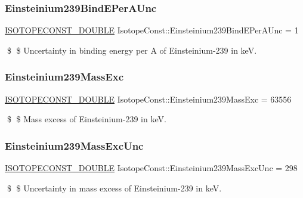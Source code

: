 \subsubsection{\texorpdfstring{Einsteinium239\+Bind\+E\+Per\+A\+Unc}{Einsteinium239BindEPerAUnc}}
{\footnotesize\ttfamily \mbox{\hyperlink{group___isotope_const-_macros_ga8f45a7272ce02c0b4c65c44636ed719a}{I\+S\+O\+T\+O\+P\+E\+C\+O\+N\+S\+T\+\_\+\+D\+O\+U\+B\+LE}} Isotope\+Const\+::\+Einsteinium239\+Bind\+E\+Per\+A\+Unc = 1}

\$ \$ Uncertainty in binding energy per A of Einsteinium-\/239 in keV. \mbox{\label{group___isotope_const-_einsteinium-_es239_gafae2258f4bb67cee3b976cdb4d773bc5}} 
\subsubsection{\texorpdfstring{Einsteinium239\+Mass\+Exc}{Einsteinium239MassExc}}
{\footnotesize\ttfamily \mbox{\hyperlink{group___isotope_const-_macros_ga8f45a7272ce02c0b4c65c44636ed719a}{I\+S\+O\+T\+O\+P\+E\+C\+O\+N\+S\+T\+\_\+\+D\+O\+U\+B\+LE}} Isotope\+Const\+::\+Einsteinium239\+Mass\+Exc = 63556}

\$ \$ Mass excess of Einsteinium-\/239 in keV. \mbox{\label{group___isotope_const-_einsteinium-_es239_ga7c50b6843021e6f20bd4f8ac5c2fa7e6}} 
\subsubsection{\texorpdfstring{Einsteinium239\+Mass\+Exc\+Unc}{Einsteinium239MassExcUnc}}
{\footnotesize\ttfamily \mbox{\hyperlink{group___isotope_const-_macros_ga8f45a7272ce02c0b4c65c44636ed719a}{I\+S\+O\+T\+O\+P\+E\+C\+O\+N\+S\+T\+\_\+\+D\+O\+U\+B\+LE}} Isotope\+Const\+::\+Einsteinium239\+Mass\+Exc\+Unc = 298}

\$ \$ Uncertainty in mass excess of Einsteinium-\/239 in keV. \mbox{\label{group___isotope_const-_einsteinium-_es239_ga508761e3d87f94e89093b2006998a922}} 
